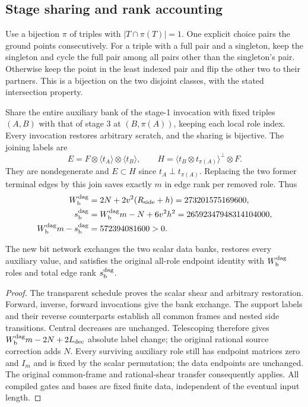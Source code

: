 \subsection{Stage sharing and rank accounting}
Use a bijection $\pi$ of triples with $|T\cap\pi(T)|=1$. One explicit
choice pairs the ground points consecutively. For a triple with a full pair
and a singleton, keep the singleton and cycle the full pair among all pairs
other than the singleton's pair. Otherwise keep the point in the least
indexed pair and flip the other two to their partners. This is a bijection
on the two disjoint classes, with the stated intersection property.

Share the entire auxiliary bank of the stage-1 invocation with fixed triples
$(A,B)$ with that of stage 3 at $(B,\pi(A))$, keeping each local role index.
Every invocation restores arbitrary scratch, and the sharing is bijective.
The joining labels are
\[
 E=F\otimes\langle t_A\rangle\otimes\langle t_B\rangle,
 \qquad H=\langle t_B\otimes t_{\pi(A)}\rangle^\perp\otimes F.
\]
They are nondegenerate and $E\subset H$ since $t_A\perp t_{\pi(A)}$.
Replacing the two former terminal edges by this join saves exactly $m$ in
edge rank per removed role. Thus
\begin{align*}
 W_{\rm b}^{\rm dag}&=2N+2v^2(R_{\rm side}+h)=273201575169600,\\
 s_{\rm b}^{\rm dag}&=W_{\rm b}^{\rm dag}m-N+6v^2h^2
                         =26592347948314104000,\\
 W_{\rm b}^{\rm dag}m-s_{\rm b}^{\rm dag}&=572394081600>0.
\end{align*}

\begin{proposition}\label{prop:dag-bit-interface}
The new bit network exchanges the two scalar data banks, restores every
auxiliary value, and satisfies the original all-role endpoint identity with
$W_{\rm b}^{\rm dag}$ roles and total edge rank $s_{\rm b}^{\rm dag}$.
\end{proposition}
\begin{proof}
The transparent schedule proves the scalar shear and arbitrary restoration.
Forward, inverse, forward invocations give the bank exchange. The support
labels and their reverse counterparts establish all common frames and nested
side transitions. Central decreases are unchanged. Telescoping therefore gives
$W_{\rm b}^{\rm dag}m-2N+2L_{\rm dec}$ absolute label change; the original
rational source correction adds $N$. Every surviving auxiliary role still
has endpoint matrices zero and $I_m$ and is fixed by the scalar permutation;
the data endpoints are unchanged. The original common-frame and rational-shear
transfer consequently applies. All compiled gates and bases are fixed finite
data, independent of the eventual input length.
\end{proof}

